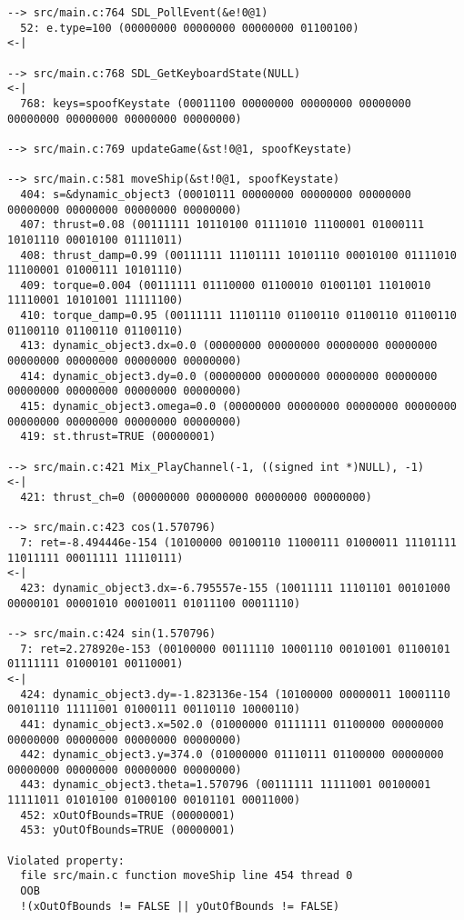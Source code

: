 \begin{verbatim}
--> src/main.c:764 SDL_PollEvent(&e!0@1)
  52: e.type=100 (00000000 00000000 00000000 01100100)
<-|

--> src/main.c:768 SDL_GetKeyboardState(NULL)
<-|
  768: keys=spoofKeystate (00011100 00000000 00000000 00000000 00000000 00000000 00000000 00000000)

--> src/main.c:769 updateGame(&st!0@1, spoofKeystate)

--> src/main.c:581 moveShip(&st!0@1, spoofKeystate)
  404: s=&dynamic_object3 (00010111 00000000 00000000 00000000 00000000 00000000 00000000 00000000)
  407: thrust=0.08 (00111111 10110100 01111010 11100001 01000111 10101110 00010100 01111011)
  408: thrust_damp=0.99 (00111111 11101111 10101110 00010100 01111010 11100001 01000111 10101110)
  409: torque=0.004 (00111111 01110000 01100010 01001101 11010010 11110001 10101001 11111100)
  410: torque_damp=0.95 (00111111 11101110 01100110 01100110 01100110 01100110 01100110 01100110)
  413: dynamic_object3.dx=0.0 (00000000 00000000 00000000 00000000 00000000 00000000 00000000 00000000)
  414: dynamic_object3.dy=0.0 (00000000 00000000 00000000 00000000 00000000 00000000 00000000 00000000)
  415: dynamic_object3.omega=0.0 (00000000 00000000 00000000 00000000 00000000 00000000 00000000 00000000)
  419: st.thrust=TRUE (00000001)

--> src/main.c:421 Mix_PlayChannel(-1, ((signed int *)NULL), -1)
<-|
  421: thrust_ch=0 (00000000 00000000 00000000 00000000)

--> src/main.c:423 cos(1.570796)
  7: ret=-8.494446e-154 (10100000 00100110 11000111 01000011 11101111 11011111 00011111 11110111)
<-|
  423: dynamic_object3.dx=-6.795557e-155 (10011111 11101101 00101000 00000101 00001010 00010011 01011100 00011110)

--> src/main.c:424 sin(1.570796)
  7: ret=2.278920e-153 (00100000 00111110 10001110 00101001 01100101 01111111 01000101 00110001)
<-|
  424: dynamic_object3.dy=-1.823136e-154 (10100000 00000011 10001110 00101110 11111001 01000111 00110110 10000110)
  441: dynamic_object3.x=502.0 (01000000 01111111 01100000 00000000 00000000 00000000 00000000 00000000)
  442: dynamic_object3.y=374.0 (01000000 01110111 01100000 00000000 00000000 00000000 00000000 00000000)
  443: dynamic_object3.theta=1.570796 (00111111 11111001 00100001 11111011 01010100 01000100 00101101 00011000)
  452: xOutOfBounds=TRUE (00000001)
  453: yOutOfBounds=TRUE (00000001)

Violated property:
  file src/main.c function moveShip line 454 thread 0
  OOB
  !(xOutOfBounds != FALSE || yOutOfBounds != FALSE)
\end{verbatim}
